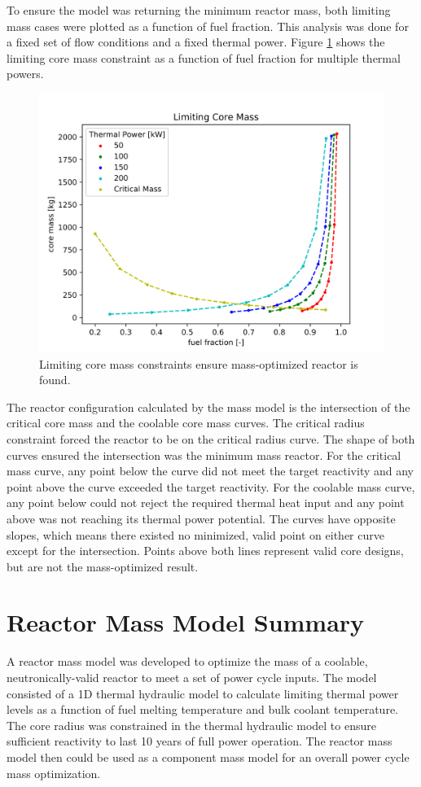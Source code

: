 To ensure the model was returning the minimum reactor mass, both limiting mass
cases were plotted as a function of fuel fraction. This analysis was done for a
fixed set of flow conditions and a fixed thermal power. Figure
\ref{fig:limiting_core_mass} shows the limiting core mass constraint as a
function of fuel fraction for multiple thermal powers.

\begin{figure}[h]
    \centering
    \includegraphics[width=5in]{../images/limiting_core_mass.png}
\caption{Limiting core mass constraints ensure mass-optimized reactor is found.}
\label{fig:limiting_core_mass}
\end{figure}

The reactor configuration calculated by the mass model is the intersection of
the critical core mass and the coolable core mass curves. The critical radius
constraint forced the reactor to be on the critical radius curve. The shape of
both curves ensured the intersection was the minimum mass reactor. For the
critical mass curve, any point below the curve did not meet the target
reactivity and any point above the curve exceeded the target reactivity. For the
coolable mass curve, any point below could not reject the required thermal heat
input and any point above was not reaching its thermal power potential. The
curves have opposite slopes, which means there existed no minimized, valid point on either
curve except for the intersection. Points above both lines represent valid
core designs, but are not the mass-optimized result.

\section{Reactor Mass Model Summary}
A reactor mass model was developed to optimize the mass of a coolable,
neutronically-valid reactor to meet a set of power cycle inputs. The model
consisted of a 1D thermal hydraulic model to calculate limiting thermal power
levels as a function of fuel melting temperature and bulk coolant temperature.
The core radius was constrained in the thermal hydraulic model to ensure
sufficient reactivity to last 10 years of full power operation. The reactor mass
model then could be used as a component mass model for an overall power cycle
mass optimization.
